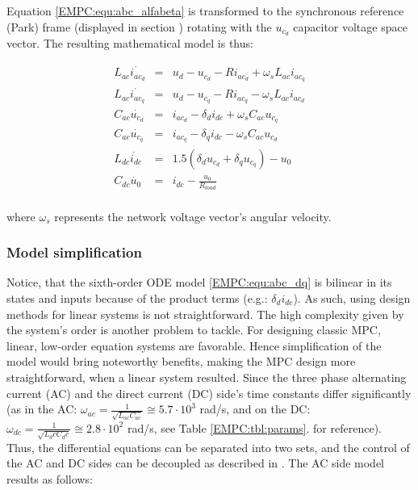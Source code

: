     Equation \ref{EMPC:equ:abc_alfabeta} is transformed to the synchronous reference (Park) frame (displayed in section ) rotating with the $u_{c_d}$ capacitor voltage space vector. The resulting mathematical model is thus:

    \begin{equation}
        \begin{array}{rcl}
            L_{ac}\dot{i_{ac_d}}&=&u_d-u_{c_d}-Ri_{ac_d}+\omega_s L_{ac}i_{ac_q}\\
            L_{ac}\dot{i_{ac_q}}&=&u_d-u_{c_q}-Ri_{ac_q}-\omega_s L_{ac}i_{ac_d}\\
            C_{ac}\dot{u_{c_d}}&=&i_{ac_d}-\delta_di_{dc}+\omega_s C_{ac}u_{c_q}\\
            C_{ac}\dot{u_{c_q}}&=&i_{ac_q}-\delta_qi_{dc}-\omega_s C_{ac}u_{c_d}\\
            L_{dc}\dot{i_{dc}}&=&1.5(\delta_d u_{c_d}+\delta_q u_{c_q})-u_0\\
            C_{dc}\dot{u_0}&=&i_{dc}-\frac{u_0}{R_{load}}\\
        \end{array}
        \label{EMPC:equ:abc_dq}
    \end{equation}

    where $\omega_s$ represents the network voltage vector’s angular velocity.

    \subsubsection{Model simplification}\label{EMPC:sec:Simplification}

    Notice, that the sixth-order ODE model \ref{EMPC:equ:abc_dq} is bilinear in its states and inputs because of the product terms (e.g.: $\delta_di_{dc}$). As such, using design methods for linear systems is not straightforward. The high complexity given by the system’s order is another problem to tackle. For designing classic MPC, linear, low-order equation systems are favorable. Hence simplification of the model would bring noteworthy benefits, making the MPC design more straightforward, when a linear system resulted.
    Since the three phase alternating current (AC) and the direct current (DC) side’s time constants differ significantly (as in the AC: $\omega_{ac}=\frac{1}{\sqrt{L_{ac} C_{ac}}}\cong5.7\cdot10^3$ rad/s, and on the DC: $\omega_{dc}=\frac{1}{\sqrt{L_dc C_dc}}\cong2.8\cdot10^2$ rad/s, see Table \ref{EMPC:tbl:params}. for reference). Thus, the differential equations can be separated into two sets, and the control of the AC and DC sides can be decoupled as described in \cite{ahmed2014model}. The AC side model results as follows:


